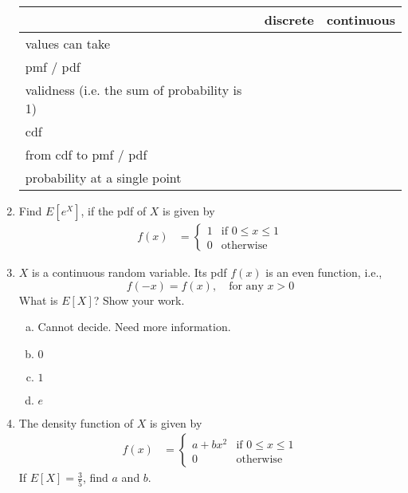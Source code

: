\documentclass[11pt]{article}
\begin{document}
\begin{enumerate}
\begin{center}
\begin{tabular}{ |p{1.5in}| p{1.25in}| p{1.25in}|}%
\hline
\vspace{1mm}
&discrete & continuous  \\ \hline
\vspace{1mm}
values can take& & \\ \hline
\vspace{1mm}
pmf / pdf& &\\ \hline
\vspace{1mm}
validness (i.e. the sum of probability is 1) & &\\ \hline
\vspace{1mm}
cdf & &\\ \hline
\vspace{1mm}
from cdf to pmf / pdf & &\\ \hline
\vspace{1mm}
probability at a single point & &\\ \hline
\end{tabular}
\end{center}

\item Find $E[e^X]$, if the pdf of $X$ is given by
\begin{align*}
f(x) &=
\begin{cases}
1& \text{if $0 \leq x \leq 1$} \\
0 & \text{otherwise}
\end{cases}
\end{align*}

\item $X$ is a continuous random variable. Its pdf $f(x)$ is an even function, i.e.,
\[ f(-x) = f(x), \quad \text{for any } x > 0 \]
What is $E[X]$? Show your work. 
\begin{enumerate}[(a)]
\item Cannot decide. Need more information.
\item $0$
\item $1$
\item $e$
\end{enumerate}


\item The density function of $X$ is given by
\begin{align*}
f(x) &= \begin{cases}
a + bx^2 & \text{if $0 \leq x \leq 1$} \\
0 & \text{otherwise}
\end{cases}
\end{align*}
If $E[X] = \frac{3}{5}$, find $a$ and $b$.


\end{enumerate}
\end{document}
